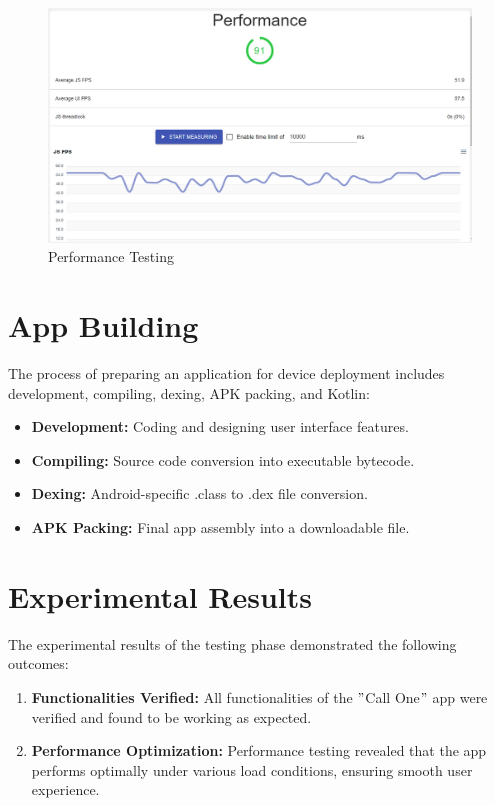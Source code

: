 \begin{figure}
    \centering
    \includegraphics[width=1\linewidth]{Media//Chapter 6/performance}
    \caption{Performance Testing}
    \label{fig: Performance Testing}
\end{figure}

\section{App Building}\label{sec:app-building}

The process of preparing an application for device deployment includes development, compiling, dexing, APK packing, and Kotlin:

\begin{itemize}
    \item \textbf{Development:} Coding and designing user interface features.
    \item \textbf{Compiling:} Source code conversion into executable bytecode.
    \item \textbf{Dexing:} Android-specific .class to .dex file conversion.
    \item \textbf{APK Packing:} Final app assembly into a downloadable file.
\end{itemize}

\section{Experimental Results}\label{sec:experimental-results}

The experimental results of the testing phase demonstrated the following outcomes:

\begin{enumerate}[label=\roman*.]
    \item \textbf{Functionalities Verified:} All functionalities of the \("\)Call One\("\) app were verified and found to be working as expected.
    
    \item \textbf{Performance Optimization:} Performance testing revealed that the app performs optimally under various load conditions, ensuring smooth user experience.
    
\end{enumerate}

